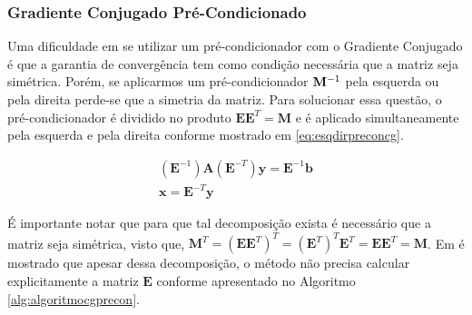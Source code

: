 \subsubsection{Gradiente Conjugado Pré-Condicionado}

Uma dificuldade em se utilizar um pré-condicionador com o Gradiente Conjugado é que a garantia de convergência tem como condição necessária que a matriz seja simétrica. Porém, se aplicarmos um pré-condicionador $\mathbf{M}^{-1}$ pela esquerda ou pela direita perde-se que a simetria da matriz. Para solucionar essa questão, o pré-condicionador é dividido no produto $\mathbf{E}\mathbf{E}^T = \mathbf{M}$ e é aplicado simultaneamente pela esquerda e pela direita conforme mostrado em \eqref{eq:esqdirpreconcg}.


\begin{align} \label{eq:esqdirpreconcg}
(\mathbf{E}^{-1})\mathbf{A}(\mathbf{E}^{-T}) \mathbf{y} = \mathbf{E}^{-1}\mathbf{b} \\
\mathbf{x} = \mathbf{E}^{-T} \mathbf{y}
\end{align}


É importante notar que para que tal decomposição exista é necessário que a matriz seja simétrica, visto que, $\mathbf{M}^T = (\mathbf{E}\mathbf{E}^T)^T = (\mathbf{E}^T)^T \mathbf{E}^T = \mathbf{E}\mathbf{E}^T = \mathbf{M}$. Em \citet{Shewchuk94anintroduction} é mostrado que apesar  dessa decomposição, o método não precisa calcular explicitamente a matriz $\mathbf{E}$ conforme apresentado no Algoritmo \ref{alg:algoritmocgprecon}.



